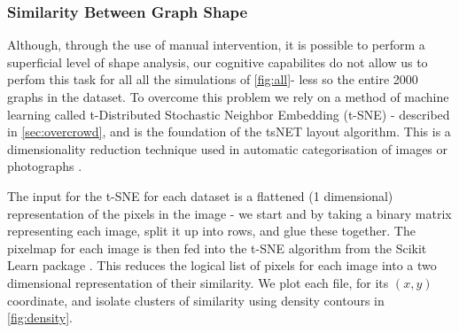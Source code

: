 



\subsubsection{Similarity Between Graph Shape}\label{sec:patternmatch}
Although, through the use of manual intervention, it is possible to perform a superficial level of shape analysis, our cognitive capabilites do not allow us to perfom this task for all all the simulations of \autoref{fig:all}- less so the entire 2000 graphs in the dataset. To overcome this problem we rely on a method of machine learning called t-Distributed Stochastic Neighbor Embedding (t-SNE) - described in \autoref{sec:overcrowd}, and is the foundation of the tsNET layout algorithm. This is a dimensionality reduction technique used in automatic categorisation of images or photographs \citep{truthandbeauty,sketchy}. 

The input for the t-SNE for each dataset is a flattened (1 dimensional) representation of the pixels in the image - we start and by taking a binary matrix representing each image, split it up into rows, and glue these together. The pixelmap for each image is then fed into the t-SNE algorithm from the Scikit Learn package \citep{scikit-learn}. This reduces the logical list of pixels for each image into a two dimensional representation of their similarity. We plot each file, for its $(x,y)$ coordinate, and isolate clusters of similarity using density contours in \autoref{fig:density}. 

